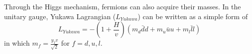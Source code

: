 Through the Higgs mechanism, fermions can also acquire their masses.
In the unitary gauge, Yukawa Lagrangian ($L_{Yukawa}$) can be written as a simple form of \cite{Pich:2015lkh}
\begin{equation}
	L_{Yukawa} = -\left(1+\frac{H}{v}\right) \left(m_{d}\bar{d}d + m_{u}\bar{u}u + m_{l}\bar{l}l\right)
\end{equation}
in which $m_{f} = \frac{y_{f}v}{\sqrt{2}}$ for $f = d, u, l$.
